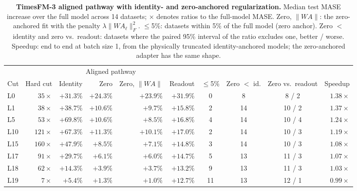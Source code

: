 \begin{table}[t]
\centering
\caption{\textbf{TimesFM-3 aligned pathway with identity- and zero-anchored regularization.} Median test MASE increase over the full model across 14 datasets; $\times$ denotes ratios to the full-model MASE. Zero, $\|WA\|$: the zero-anchored fit with the penalty $\lambda\|W A_\ell\|_F^2$. $\le$5\%: datasets within 5\% of the full model (zero anchor). Zero $<$ identity and zero vs.\ readout: datasets where the paired 95\% interval of the ratio excludes one, better / worse. Speedup: end to end at batch size 1, from the physically truncated identity-anchored models; the zero-anchored adapter has the same shape.}
\vspace{4pt}
\label{tab:timesfm3_ridge}
\small
\setlength{\tabcolsep}{3.5pt}
\begin{tabular}{@{}lrrrrrcccr@{}}
\toprule
& & \multicolumn{3}{c}{Aligned pathway} & & & & & \\
\cmidrule(lr){3-5}
Cut & Hard cut & Identity & Zero & Zero, $\|WA\|$ & Readout & $\le$5\% & Zero $<$ id. & Zero vs.\ readout & Speedup \\
\midrule
L0 & $35\times$ & $+31.3\%$ & $+24.3\%$ & $+23.9\%$ & $+31.9\%$ & 0 & 8 & 8 / 2 & $1.38\times$ \\
L1 & $38\times$ & $+38.7\%$ & $+10.6\%$ & $+9.7\%$ & $+15.8\%$ & 2 & 14 & 10 / 2 & $1.37\times$ \\
L5 & $53\times$ & $+69.8\%$ & $+10.6\%$ & $+8.5\%$ & $+16.8\%$ & 4 & 14 & 10 / 4 & $1.24\times$ \\
L10 & $121\times$ & $+67.3\%$ & $+11.3\%$ & $+10.1\%$ & $+17.0\%$ & 2 & 14 & 10 / 3 & $1.19\times$ \\
L15 & $160\times$ & $+47.9\%$ & $+8.5\%$ & $+7.1\%$ & $+14.8\%$ & 3 & 14 & 10 / 3 & $1.08\times$ \\
L17 & $91\times$ & $+29.7\%$ & $+6.1\%$ & $+6.0\%$ & $+14.7\%$ & 5 & 13 & 11 / 3 & $1.07\times$ \\
L18 & $62\times$ & $+14.3\%$ & $+3.9\%$ & $+3.7\%$ & $+13.2\%$ & 9 & 13 & 11 / 3 & $1.03\times$ \\
L19 & $7\times$ & $+5.4\%$ & $+1.3\%$ & $+1.0\%$ & $+12.7\%$ & 11 & 13 & 12 / 1 & $0.99\times$ \\
\bottomrule
\end{tabular}
\end{table}


